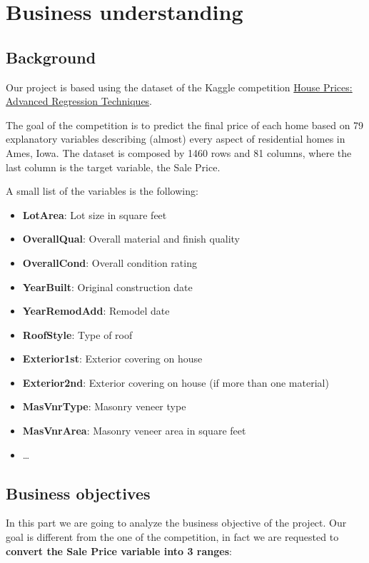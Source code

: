 \section{Business understanding}
\label{sec:business_understanding}

\subsection{Background}
Our project is based using the dataset of the Kaggle competition \href{https://www.kaggle.com/c/house-prices-advanced-regression-techniques}{House Prices: Advanced Regression Techniques}. 

The goal of the competition is to predict the final price of each home based on 79 explanatory variables describing (almost) every aspect of residential homes in Ames, Iowa.
The dataset is composed by 1460 rows and 81 columns, where the last column is the target variable, the Sale Price.

A small list of the variables is the following:

\begin{itemize}
    \item \textbf{LotArea}: Lot size in square feet
    \item \textbf{OverallQual}: Overall material and finish quality
    \item \textbf{OverallCond}: Overall condition rating
    \item \textbf{YearBuilt}: Original construction date
    \item \textbf{YearRemodAdd}: Remodel date
    \item \textbf{RoofStyle}: Type of roof
    \item \textbf{Exterior1st}: Exterior covering on house
    \item \textbf{Exterior2nd}: Exterior covering on house (if more than one material)
    \item \textbf{MasVnrType}: Masonry veneer type
    \item \textbf{MasVnrArea}: Masonry veneer area in square feet
    \item \dots
\end{itemize}
\subsection{Business objectives}
\label{subsec:business_objectives}

In this part we are going to analyze the business objective of the project.
Our goal is different from the one of the competition, in fact we are requested to \textbf{convert the Sale Price variable into 3 ranges}:

